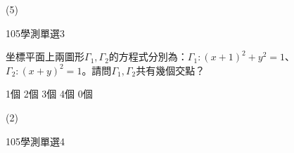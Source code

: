 \begin{QUESTIONS}
\begin{QUESTION}
\begin{QFROMS}
        \end{QFROMS}
        \begin{QTAGS}\end{QTAGS}
        \begin{QANS}
            (5)
        \end{QANS}
        \begin{QSOLLIST}
        \end{QSOLLIST}
        \begin{QEMPTYSPACE}
        \end{QEMPTYSPACE}
    \end{QUESTION}
    \begin{QUESTION}
        \begin{ExamInfo}{105}{學測}{單選}{3}
        \end{ExamInfo}
        \begin{ExamAnsRateInfo}{54}{77}{53}{32}
        \end{ExamAnsRateInfo}
        \begin{QBODY}
            坐標平面上兩圖形${{\Gamma }_{1}},{{\Gamma }_{2}}$的方程式分別為：${{\Gamma }_{1}}:{{(x+1)}^{2}}+{{y}^{2}}=1$、${{\Gamma }_{2}}:{{(x+y)}^{2}}=1$。請問${{\Gamma }_{1}},{{\Gamma }_{2}}$共有幾個交點？
			\begin{QOPS}
				\QOP 1個	
				\QOP 2個	
				\QOP 3個	
				\QOP 4個	
				\QOP 0個
			\end{QOPS}
        \end{QBODY}
        \begin{QFROMS}
        \end{QFROMS}
        \begin{QTAGS}\end{QTAGS}
        \begin{QANS}
            (2)
        \end{QANS}
        \begin{QSOLLIST}
        \end{QSOLLIST}
        \begin{QEMPTYSPACE}
        \end{QEMPTYSPACE}
    \end{QUESTION}
    \begin{QUESTION}
        \begin{ExamInfo}{105}{學測}{單選}{4}
        \end{ExamInfo}
        \begin{ExamAnsRateInfo}{54}{91}{55}{16}

\end{ExamAnsRateInfo}
\end{QUESTION}
\end{QUESTIONS}
